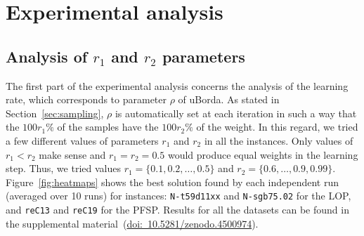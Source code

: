 \documentclass[sigconf,dvipsnames]{acmart}
\newcommand{\supplement}{\href{http://doi.org/10.5281/zenodo.4500974}{doi:~10.5281/zenodo.4500974}}
\begin{document}
\section{Experimental analysis}\label{sec:analysis}

\subsection{Analysis of $r_1$ and $r_2$ parameters}

The first part of the experimental analysis concerns the analysis of the learning rate, which corresponds to parameter $\rho$ of uBorda. As stated in Section~\ref{sec:sampling}, $\rho$ is automatically set at each iteration in such a way that the $100r_1\%$ of the samples have the $100r_2\%$ of the weight. In this regard, we tried a few different values of parameters $r_1$ and $r_2$ in all the instances. Only values of $r_1 < r_2$ make sense and $r_1 = r_2 = 0.5$ would produce equal weights in the learning step. Thus, we tried values $r_1 = \{0.1, 0.2, \dotsc, 0.5\}$ and $r_2 = \{0.6,\dotsc, 0.9, 0.99\}$. Figure~\ref{fig:heatmaps} shows the best solution found by each independent run (averaged over 10 runs) for instances: \texttt{N-t59d11xx} and \texttt{N-sgb75.02} for the LOP, and \texttt{reC13} and \texttt{reC19} for the PFSP. Results for all the datasets can be found in the supplemental material~(\supplement).
\end{document}
